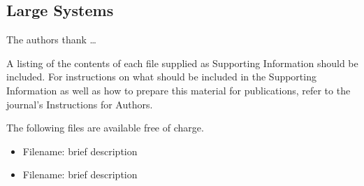 \documentclass[journal=jctcce,manuscript=article]{achemso}
\begin{document}
\subsection{Large Systems}



\begin{acknowledgement}

The authors thank \ldots

\end{acknowledgement}

\begin{suppinfo}

A listing of the contents of each file supplied as Supporting Information
should be included. For instructions on what should be included in the
Supporting Information as well as how to prepare this material for
publications, refer to the journal's Instructions for Authors.

The following files are available free of charge.
\begin{itemize}
  \item Filename: brief description
  \item Filename: brief description
\end{itemize}

\end{suppinfo}


\end{document}
